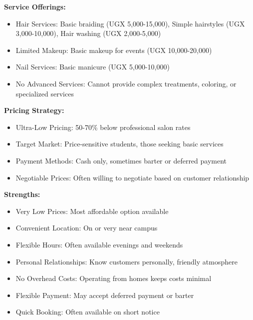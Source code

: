 \documentclass[a4paper,12pt]{article}
\begin{document}
\textbf{Service Offerings:}
\begin{itemize}[leftmargin=2em]
    \item Hair Services: Basic braiding (UGX 5,000-15,000), Simple hairstyles (UGX 3,000-10,000), Hair washing (UGX 2,000-5,000)
    \item Limited Makeup: Basic makeup for events (UGX 10,000-20,000)
    \item Nail Services: Basic manicure (UGX 5,000-10,000)
    \item No Advanced Services: Cannot provide complex treatments, coloring, or specialized services
\end{itemize}

\textbf{Pricing Strategy:}
\begin{itemize}[leftmargin=2em]
    \item Ultra-Low Pricing: 50-70\% below professional salon rates
    \item Target Market: Price-sensitive students, those seeking basic services
    \item Payment Methods: Cash only, sometimes barter or deferred payment
    \item Negotiable Prices: Often willing to negotiate based on customer relationship
\end{itemize}

\textbf{Strengths:}
\begin{itemize}[leftmargin=2em]
    \item Very Low Prices: Most affordable option available
    \item Convenient Location: On or very near campus
    \item Flexible Hours: Often available evenings and weekends
    \item Personal Relationships: Know customers personally, friendly atmosphere
    \item No Overhead Costs: Operating from homes keeps costs minimal
    \item Flexible Payment: May accept deferred payment or barter
    \item Quick Booking: Often available on short notice
\end{itemize}
\end{document}
